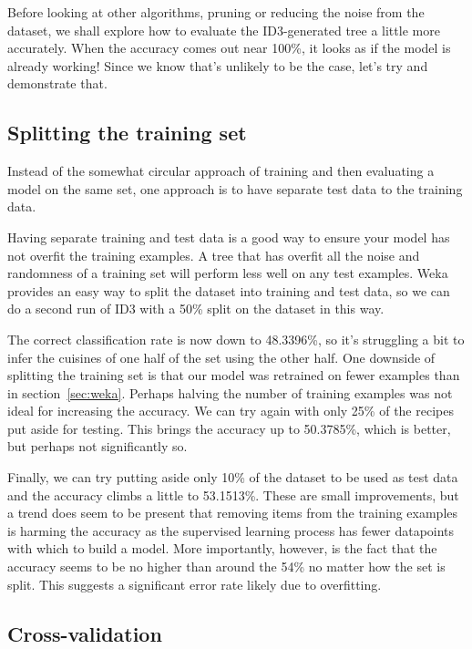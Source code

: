 \documentclass[11pt,a4paper]{article}
\begin{document}
Before looking at other algorithms, pruning or reducing the noise from the dataset,
we shall explore how to evaluate the ID3-generated tree a little more accurately.
When the accuracy comes out near 100\%, it looks as if the model is already working!
Since we know that's unlikely to be the case, let's try and demonstrate that.

\subsection{Splitting the training set}

Instead of the somewhat circular approach of training and then evaluating a model on the
same set, one approach is to have separate test data to the training data.

Having separate training and test data is a good way to ensure your model has not
overfit the training examples. A tree that has overfit all the noise and randomness of a training
set will perform less well on any test examples. \cite{tetko1995neural} Weka provides
an easy way to split the dataset into training and test data, so we can do a
second run of ID3 with a 50\% split on the dataset in this way.

The correct classification rate is now down to 48.3396\%, so it's struggling a bit to infer
the cuisines of one half of the set using the other half. One downside of splitting the
training set is that our model was retrained on fewer examples than in section~\ref{sec:weka}.
Perhaps halving the number
of training examples was not ideal for increasing the accuracy. We can try again with only
25\% of the recipes put aside for testing. This brings the accuracy up to 50.3785\%, which
is better, but perhaps not significantly so.

Finally, we can try putting aside only 10\% of the dataset to be used as test data
and the accuracy climbs a little to 53.1513\%. These are small improvements, but a trend
does seem to be present that removing items from the training examples is harming the
accuracy as the supervised learning process has fewer datapoints with which to build a
model. More importantly, however, is the fact that the accuracy seems to be no
higher than around the 54\% no matter how the set is split. This suggests a significant
error rate likely due to overfitting.

\subsection{Cross-validation}
\end{document}
